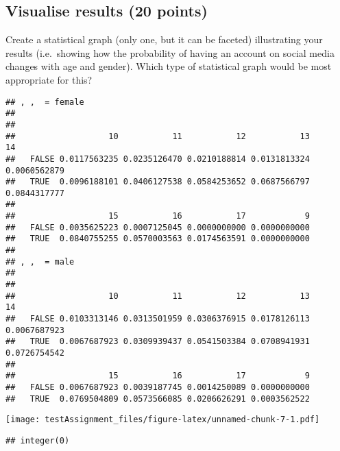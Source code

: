 \documentclass[
]{article}
\begin{document}
\hypertarget{visualise-results-20-points}{%
\subsection{Visualise results (20
points)}\label{visualise-results-20-points}}

Create a statistical graph (only one, but it can be faceted)
illustrating your results (i.e.~showing how the probability of having an
account on social media changes with age and gender). Which type of
statistical graph would be most appropriate for this?

\begin{verbatim}
## , ,  = female
## 
##        
##                   10           11           12           13           14
##   FALSE 0.0117563235 0.0235126470 0.0210188814 0.0131813324 0.0060562879
##   TRUE  0.0096188101 0.0406127538 0.0584253652 0.0687566797 0.0844317777
##        
##                   15           16           17            9
##   FALSE 0.0035625223 0.0007125045 0.0000000000 0.0000000000
##   TRUE  0.0840755255 0.0570003563 0.0174563591 0.0000000000
## 
## , ,  = male
## 
##        
##                   10           11           12           13           14
##   FALSE 0.0103313146 0.0313501959 0.0306376915 0.0178126113 0.0067687923
##   TRUE  0.0067687923 0.0309939437 0.0541503384 0.0708941931 0.0726754542
##        
##                   15           16           17            9
##   FALSE 0.0067687923 0.0039187745 0.0014250089 0.0000000000
##   TRUE  0.0769504809 0.0573566085 0.0206626291 0.0003562522
\end{verbatim}

\texttt{[image: testAssignment\_files/figure-latex/unnamed-chunk-7-1.pdf]}

\begin{verbatim}
## integer(0)
\end{verbatim}
\end{document}
